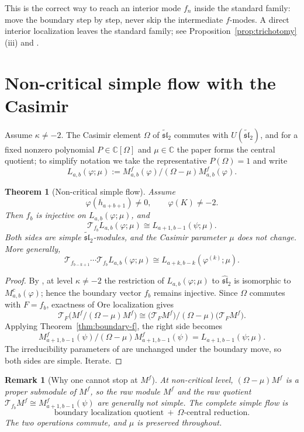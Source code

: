 \documentclass[11pt,a4paper]{article}
\newcommand{\C}{\mathbb C}
\newcommand{\slh}{\widehat{\mathfrak{sl}}_2}
\newcommand{\slt}{\widetilde{\mathfrak{sl}}_2}
\newcommand{\T}{\mathcal T}
\theoremstyle{plainupright}
\newtheorem{theorem}[proposition]{Theorem}
\newtheorem{remark}[proposition]{Remark}
\begin{document}
This is the correct way to reach an interior mode \(f_n\) inside the standard
family: move the boundary step by step, never skip the intermediate
\(f\)-modes. A direct interior localization leaves the standard family; see
Proposition~\ref{prop:trichotomy}(iii) and \cite{Nonboundary}.

\section{Non-critical simple flow with the Casimir}\label{sec:omega}

Assume \(\kappa\ne-2\). The Casimir element \(\Omega\) of \(\slt\) commutes
with \(U(\slt)\), and for a fixed nonzero polynomial \(P\in\C[\Omega]\) and
\(\mu\in\C\) the paper \cite{FGXZ} forms the central quotient; to simplify
notation we take the representative \(P(\Omega)=1\) and write
\[
L_{a,b}(\varphi;\mu):=M^f_{a,b}(\varphi)/(\Omega-\mu)M^f_{a,b}(\varphi).
\]

\begin{theorem}[Non-critical simple flow]\label{thm:omega-flow}
Assume
\[
\varphi(h_{a+b+1})\ne0,\qquad \varphi(K)\ne-2.
\]
Then \(f_b\) is injective on \(L_{a,b}(\varphi;\mu)\), and
\[
\boxed{\ \T_{f_b}L_{a,b}(\varphi;\mu)\cong L_{a+1,b-1}(\psi;\mu).\ }
\]
Both sides are simple \(\slt\)-modules, and the Casimir parameter \(\mu\) does
not change. More generally,
\[
\T_{f_{b-k+1}}\cdots\T_{f_b}L_{a,b}(\varphi;\mu)
\cong L_{a+k,b-k}(\varphi^{(k)};\mu).
\]
\end{theorem}

\begin{proof}
By \cite[formula (4.1)]{FGXZ}, at level \(\kappa\ne-2\) the restriction of
\(L_{a,b}(\varphi;\mu)\) to \(\slh\) is isomorphic to \(M^c_{a,b}(\varphi)\);
hence the boundary vector \(f_b\) remains injective. Since \(\Omega\) commutes
with \(F=f_b\), exactness of Ore localization gives
\[
\T_F\bigl(M^f/(\Omega-\mu)M^f\bigr)
\cong
\bigl(\T_FM^f\bigr)/(\Omega-\mu)\bigl(\T_FM^f\bigr).
\]
Applying Theorem~\ref{thm:boundary-f}, the right side becomes
\[
M^f_{a+1,b-1}(\psi)/(\Omega-\mu)M^f_{a+1,b-1}(\psi)
=L_{a+1,b-1}(\psi;\mu).
\]
The irreducibility parameters of \cite[Theorem 4.1]{FGXZ} are unchanged under
the boundary move, so both sides are simple. Iterate.
\end{proof}

\begin{remark}[Why one cannot stop at \(M^f\)]\label{rem:omega}
At non-critical level, \((\Omega-\mu)M^f\) is a proper submodule of \(M^f\),
so the raw module \(M^f\) and the raw quotient
\(\T_{f_b}M^f\cong M^f_{a+1,b-1}(\psi)\) are generally not simple. The complete
simple flow is
\[
\boxed{\ \text{boundary localization quotient}\ +\ \Omega\text{-central reduction}.\ }
\]
The two operations commute, and \(\mu\) is preserved throughout.
\end{remark}
\end{document}
